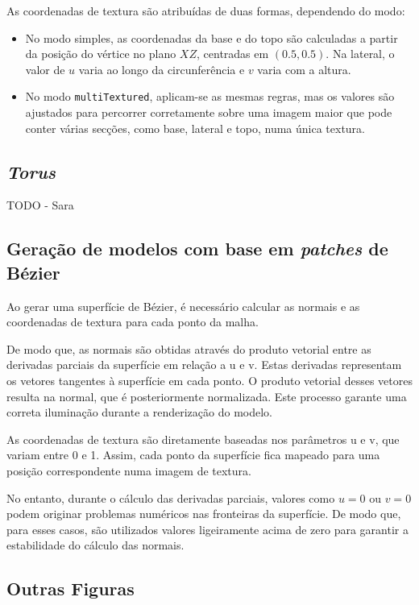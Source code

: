 \documentclass[12pt, a4paper]{article}
\begin{document}
As coordenadas de textura são atribuídas de duas formas, dependendo do modo:

\begin{itemize}
    \item No modo simples, as coordenadas da base e do topo são calculadas a partir da posição do
    vértice no plano $XZ$, centradas em $(0.5, 0.5)$. Na lateral, o valor de $u$ varia ao longo da
    circunferência e $v$ varia com a altura.
    \item No modo \texttt{multiTextured}, aplicam-se as mesmas regras, mas os valores são ajustados
    para percorrer corretamente sobre uma imagem maior que pode conter várias secções, como base,
    lateral e topo, numa única textura.
\end{itemize}

\subsection{\emph{Torus}}

{\color{red} TODO - Sara}

\subsection{Geração de modelos com base em \emph{patches} de Bézier}

Ao gerar uma superfície de Bézier, é necessário calcular as normais e as coordenadas de textura para
cada ponto da malha.

De modo que, as normais são obtidas através do produto vetorial entre as derivadas
parciais da superfície em relação a u e v. Estas derivadas representam os vetores tangentes à
superfície em cada ponto. O produto vetorial desses vetores resulta na normal, que é posteriormente
normalizada. Este processo garante uma correta iluminação durante a renderização do modelo.

As coordenadas de textura são diretamente baseadas nos parâmetros u e v, que variam entre 0 e 1.
Assim, cada ponto da superfície fica mapeado para uma posição correspondente numa imagem de textura.

No entanto, durante o cálculo das derivadas parciais, valores como $u = 0$ ou $v = 0$ podem
originar problemas numéricos nas fronteiras da superfície. De modo que, para esses casos, são
utilizados valores ligeiramente acima de zero para garantir a estabilidade do cálculo das normais.

\subsection{Outras Figuras}
\end{document}

